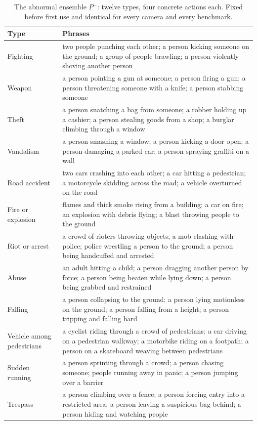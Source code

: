 \documentclass[conference,a4paper]{IEEEtran}
\begin{document}
\begin{table}[!t]
\caption{The abnormal ensemble $P^{-}$: twelve types, four concrete actions each.
Fixed before first use and identical for every camera and every benchmark.}
\label{tbl:bank}
\centering
\footnotesize
\begin{tabularx}{\textwidth}{@{}W{3.1cm} Z@{}}
\toprule
\textbf{Type} & \textbf{Phrases} \\
\midrule
Fighting & two people punching each other; a person kicking someone on the ground; a group of people brawling; a person violently shoving another person \\
Weapon & a person pointing a gun at someone; a person firing a gun; a person threatening someone with a knife; a person stabbing someone \\
Theft & a person snatching a bag from someone; a robber holding up a cashier; a person stealing goods from a shop; a burglar climbing through a window \\
Vandalism & a person smashing a window; a person kicking a door open; a person damaging a parked car; a person spraying graffiti on a wall \\
Road accident & two cars crashing into each other; a car hitting a pedestrian; a motorcycle skidding across the road; a vehicle overturned on the road \\
Fire or explosion & flames and thick smoke rising from a building; a car on fire; an explosion with debris flying; a blast throwing people to the ground \\
Riot or arrest & a crowd of rioters throwing objects; a mob clashing with police; police wrestling a person to the ground; a person being handcuffed and arrested \\
Abuse & an adult hitting a child; a person dragging another person by force; a person being beaten while lying down; a person being grabbed and restrained \\
Falling & a person collapsing to the ground; a person lying motionless on the ground; a person falling from a height; a person tripping and falling hard \\
Vehicle among pedestrians & a cyclist riding through a crowd of pedestrians; a car driving on a pedestrian walkway; a motorbike riding on a footpath; a person on a skateboard weaving between pedestrians \\
Sudden running & a person sprinting through a crowd; a person chasing someone; people running away in panic; a person jumping over a barrier \\
Trespass & a person climbing over a fence; a person forcing entry into a restricted area; a person leaving a suspicious bag behind; a person hiding and watching people \\
\bottomrule
\end{tabularx}
\end{table}
\end{document}
